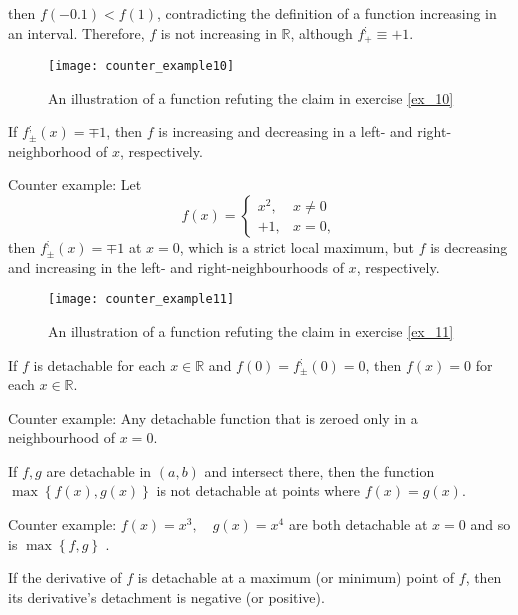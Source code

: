 \documentclass[11pt]{book}
\begin{document}
then $f\left(-0.1\right)<f\left(1\right)$, contradicting the definition
of a function increasing in an interval. Therefore, $f$ is not increasing
in $\mathbb{R}$, although $f_{+}^{;}\equiv+1$.

\begin{figure}[h!]
\texttt{[image: counter\_example10]}
\label{counter_example7}
\caption{An illustration of a function refuting the claim in exercise \ref{ex_10}}
\end{figure}

\begin{exercise}\label{ex_11}If $f_{\pm}^{;}\left(x\right)=\mp1$, then $f$ is increasing and
decreasing in a left- and right-neighborhood of $x$, respectively.
\end{exercise}

Counter example: Let
\[
f\left(x\right)=\begin{cases}
x^{2}, & x\neq0\\
+1, & x=0,
\end{cases}
\]
then $f_{\pm}^{;}\left(x\right)=\mp1$ at $x=0$, which is a strict
local maximum, but $f$ is decreasing and increasing in the left-
and right-neighbourhoods of $x$, respectively.

\begin{figure}[h!]
\texttt{[image: counter\_example11]}
\label{counter_example11}
\caption{An illustration of a function refuting the claim in exercise \ref{ex_11}}
\end{figure}

\begin{exercise}If $f$ is detachable for each $x\in\mathbb{R}$ and $f\left(0\right)=f_{\pm}^{;}\left(0\right)=0$,
then $f\left(x\right)=0$ for each $x\in\mathbb{R}$. 
\end{exercise}

Counter example: Any detachable function that is zeroed only in
a neighbourhood of $x=0$.

\begin{exercise}If $f,g$ are detachable in $\left(a,b\right)$ and intersect there,
then the function $\max\left\{ f\left(x\right),g\left(x\right)\right\} $
is not detachable at points where $f\left(x\right)=g\left(x\right)$.
\end{exercise}

Counter example: $f\left(x\right)=x^{3},\quad g\left(x\right)=x^{4}$
are both detachable at $x=0$ and so is $\max\left\{ f,g\right\} $
.


\begin{exercise}If the derivative of $f$ is detachable at a maximum (or minimum)
point of $f$, then its derivative's detachment is negative (or positive).
\end{exercise}
\end{document}
